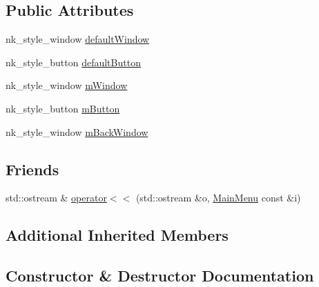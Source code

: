\subsection*{Public Attributes}
\begin{DoxyCompactItemize}
\item 
nk\+\_\+style\+\_\+window \mbox{\hyperlink{class_game_1_1_component_1_1_main_menu_a692c30bb655ebd3edef97382907ca0bf}{default\+Window}}
\item 
nk\+\_\+style\+\_\+button \mbox{\hyperlink{class_game_1_1_component_1_1_main_menu_acb84588dd4ab240f1af0e20e2fb714b0}{default\+Button}}
\item 
nk\+\_\+style\+\_\+window \mbox{\hyperlink{class_game_1_1_component_1_1_main_menu_a2c8b00fefeff1145c56bda79bdbe556f}{m\+Window}}
\item 
nk\+\_\+style\+\_\+button \mbox{\hyperlink{class_game_1_1_component_1_1_main_menu_a063226a82a6a510e3bdf1d1e90e850fd}{m\+Button}}
\item 
nk\+\_\+style\+\_\+window \mbox{\hyperlink{class_game_1_1_component_1_1_main_menu_a6d4927241338e89d529425400ff1062f}{m\+Back\+Window}}
\end{DoxyCompactItemize}
\subsection*{Friends}
\begin{DoxyCompactItemize}
\item 
std\+::ostream \& \mbox{\hyperlink{class_game_1_1_component_1_1_main_menu_a5405b4cd58a968c2e49d52e780287476}{operator$<$$<$}} (std\+::ostream \&o, \mbox{\hyperlink{class_game_1_1_component_1_1_main_menu}{Main\+Menu}} const \&i)
\end{DoxyCompactItemize}
\subsection*{Additional Inherited Members}


\subsection{Constructor \& Destructor Documentation}
\mbox{\label{class_game_1_1_component_1_1_main_menu_a9c2d8ecb603add206dfbf649cec13d02}} 
